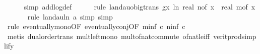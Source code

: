\begin{isabellebody}
\ \ \ \ \isamarkupfalse%
\ {\isacharparenleft}{\kern0pt}simp\ add{\isacharcolon}{\kern0pt}log{\isacharunderscore}{\kern0pt}def{\isacharparenright}{\kern0pt}\isanewline
\ \ \ \ \isamarkupfalse%
\ {\isacharparenleft}{\kern0pt}rule\ landau{\isacharunderscore}{\kern0pt}o{\isachardot}{\kern0pt}big{\isacharunderscore}{\kern0pt}trans{\isacharbrackleft}{\kern0pt}\ g{\isacharequal}{\kern0pt}{\isachardoublequoteopen}{\isasymlambda}x{\isachardot}{\kern0pt}\ ln\ {\isacharparenleft}{\kern0pt}real\ {\isacharparenleft}{\kern0pt}n{\isacharunderscore}{\kern0pt}of\ x{\isacharparenright}{\kern0pt}\ {\isacharasterisk}{\kern0pt}\ real\ {\isacharparenleft}{\kern0pt}m{\isacharunderscore}{\kern0pt}of\ x{\isacharparenright}{\kern0pt}{\isacharparenright}{\kern0pt}{\isachardoublequoteclose}{\isacharbrackright}{\kern0pt}{\isacharparenright}{\kern0pt}\isanewline
\ \ \ \ \ \isamarkupfalse%
\ {\isacharparenleft}{\kern0pt}rule\ landau{\isacharunderscore}{\kern0pt}ln{\isacharunderscore}{\kern0pt}{}{\isacharbrackleft}{\kern0pt}\ a{\isacharequal}{\kern0pt}{\isachardoublequoteopen}{}{\isachardoublequoteclose}{\isacharbrackright}{\kern0pt}{\isacharcomma}{\kern0pt}\ simp{\isacharcomma}{\kern0pt}\ simp{\isacharparenright}{\kern0pt}\isanewline
\ \ \ \ \ \ \isamarkupfalse%
\ {\isacharparenleft}{\kern0pt}rule\ eventually{\isacharunderscore}{\kern0pt}mono{\isacharbrackleft}{\kern0pt}OF\ eventually{\isacharunderscore}{\kern0pt}conj{\isacharbrackleft}{\kern0pt}OF\ m{\isacharunderscore}{\kern0pt}inf{\isacharbrackleft}{\kern0pt}\ c{\isacharequal}{\kern0pt}{\isachardoublequoteopen}{}{\isachardoublequoteclose}{\isacharbrackright}{\kern0pt}\ n{\isacharunderscore}{\kern0pt}inf{\isacharbrackleft}{\kern0pt}\ c{\isacharequal}{\kern0pt}{\isachardoublequoteopen}{}{\isachardoublequoteclose}{\isacharbrackright}{\kern0pt}{\isacharbrackright}{\kern0pt}{\isacharbrackright}{\kern0pt}{\isacharparenright}{\kern0pt}\isanewline
\ \ \ \ \ \ \isamarkupfalse%
\ {\isacharparenleft}{\kern0pt}metis\ dual{\isacharunderscore}{\kern0pt}order{\isachardot}{\kern0pt}trans\ mult{\isacharunderscore}{\kern0pt}left{\isacharunderscore}{\kern0pt}mono\ mult{\isacharunderscore}{\kern0pt}of{\isacharunderscore}{\kern0pt}nat{\isacharunderscore}{\kern0pt}commute\ of{\isacharunderscore}{\kern0pt}nat{\isacharunderscore}{\kern0pt}{}{\isacharunderscore}{\kern0pt}le{\isacharunderscore}{\kern0pt}iff\ verit{\isacharunderscore}{\kern0pt}prod{\isacharunderscore}{\kern0pt}simplify{\isacharparenleft}{\kern0pt}{}{\isacharparenright}{\kern0pt}{\isacharparenright}{\kern0pt}\isanewline

\end{isabellebody}
